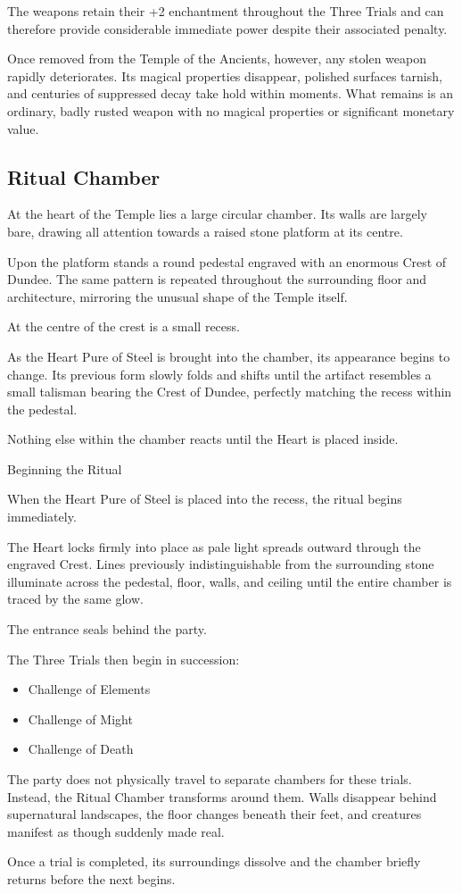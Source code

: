 {\noindent\entryfont The weapons retain their +2 enchantment throughout the Three Trials and can therefore provide considerable immediate power despite their associated penalty.

Once removed from the Temple of the Ancients, however, any stolen weapon rapidly deteriorates. Its magical properties disappear, polished surfaces tarnish, and centuries of suppressed decay take hold within moments. What remains is an ordinary, badly rusted weapon with no magical properties or significant monetary value.}

\subsection*{ Ritual Chamber}
{\entryfont At the heart of the Temple lies a large circular chamber. Its walls are largely bare, drawing all attention towards a raised stone platform at its centre.

Upon the platform stands a round pedestal engraved with an enormous Crest of Dundee. The same pattern is repeated throughout the surrounding floor and architecture, mirroring the unusual shape of the Temple itself.

At the centre of the crest is a small recess.

As the Heart Pure of Steel is brought into the chamber, its appearance begins to change. Its previous form slowly folds and shifts until the artifact resembles a small talisman bearing the Crest of Dundee, perfectly matching the recess within the pedestal.

Nothing else within the chamber reacts until the Heart is placed inside.

Beginning the Ritual

When the Heart Pure of Steel is placed into the recess, the ritual begins immediately.

The Heart locks firmly into place as pale light spreads outward through the engraved Crest. Lines previously indistinguishable from the surrounding stone illuminate across the pedestal, floor, walls, and ceiling until the entire chamber is traced by the same glow.

The entrance seals behind the party.

The Three Trials then begin in succession:
\begin{itemize}
	\item[1.] Challenge of Elements
	\item[2.] Challenge of Might
	\item[3.] Challenge of Death
\end{itemize}

The party does not physically travel to separate chambers for these trials. Instead, the Ritual Chamber transforms around them. Walls disappear behind supernatural landscapes, the floor changes beneath their feet, and creatures manifest as though suddenly made real.

Once a trial is completed, its surroundings dissolve and the chamber briefly returns before the next begins.}

